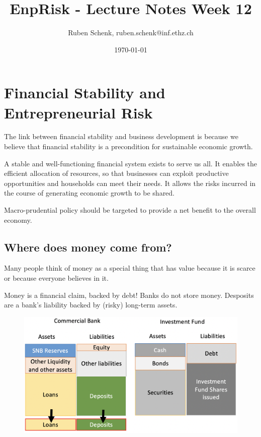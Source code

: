 \documentclass[a4paper]{extarticle}
\title{EnpRisk - Lecture Notes Week 12}
\author{Ruben Schenk, ruben.schenk@inf.ethz.ch}
\date{\today}
\begin{document}
\maketitle

\section{Financial Stability and Entrepreneurial Risk}

The link between financial stability and business development is because we believe that financial stability is a precondition for sustainable economic growth.

A stable and well-functioning financial system exists to serve us all. It enables the efficient allocation of resources, so that businesses can exploit productive opportunities and households can meet their needs. It allows the risks incurred in the course of generating economic growth to be shared.

Macro-prudential policy should be targeted to provide a net benefit to the overall economy.

\subsection{Where does money come from?}

Many people think of money as a special thing that has value because it is scarce or because everyone believes in it.

Money is a financial claim, backed by debt! Banks do not store money. Desposits are a bank's liability backed by (risky) long-term assets.

\begin{figure}[H]
    \includegraphics[width=15cm]{../images/EnpRisk_Fig12-1}
    \centering
\end{figure}
\end{document}
